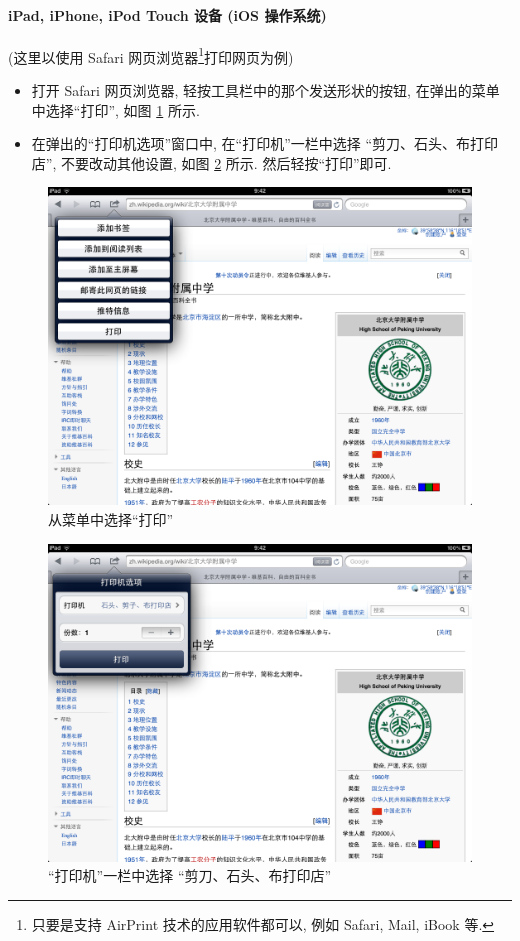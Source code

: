 \documentclass{article}
\begin{document}
\begin{CJK}{UTF8}{gbsn}
			\paragraph{iPad, iPhone, iPod Touch 设备 (iOS 操作系统)}
				(这里以使用 Safari 网页浏览器\footnote{只要是支持 AirPrint 技术的应用软件都可以, 例如 Safari, Mail, iBook 等.}打印网页为例)
				\begin{itemize}
					\item{打开 Safari 网页浏览器, 轻按工具栏中的那个发送形状的按钮, 在弹出的菜单中选择``打印'', 如图 \ref{fig:print_ipad1} 所示.}
					\item{在弹出的``打印机选项''窗口中, 在``打印机''一栏中选择 ``剪刀、石头、布打印店'', 不要改动其他设置, 如图 \ref{fig:print_ipad2} 所示. 然后轻按``打印''即可.}
				\end{itemize}
				
				\begin{figure}[hp]
					\centering
					\includegraphics[height=0.45\textheight]{print_ipad1.png}
					\caption{从菜单中选择``打印''}
					\label{fig:print_ipad1}
				\end{figure}
				\begin{figure}[hp]
					\centering
					\includegraphics[height=0.45\textheight]{print_ipad2.png}
					\caption{``打印机''一栏中选择 ``剪刀、石头、布打印店''}
					\label{fig:print_ipad2}
				\end{figure}
				\clearpage
		\newpage

\end{CJK}
\end{document}

